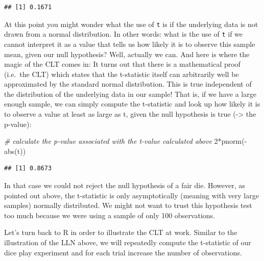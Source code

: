 \documentclass[
  12pt,
]{style/krantz}
\newenvironment{Shaded}{\begin{snugshade}}{\end{snugshade}}
\newcommand{\CommentTok}[1]{\textcolor[rgb]{0.56,0.35,0.01}{\textit{#1}}}
\newcommand{\DecValTok}[1]{\textcolor[rgb]{0.00,0.00,0.81}{#1}}
\newcommand{\FunctionTok}[1]{\textcolor[rgb]{0.00,0.00,0.00}{#1}}
\newcommand{\NormalTok}[1]{#1}
\newcommand{\SpecialCharTok}[1]{\textcolor[rgb]{0.00,0.00,0.00}{#1}}
\begin{document}
\begin{verbatim}
## [1] 0.1671
\end{verbatim}

At this point you might wonder what the use of \texttt{t} is if the underlying data is not drawn from a normal distribution. In other words: what is the use of \texttt{t} if we cannot interpret it as a value that tells us how likely it is to observe this sample mean, given our null hypothesis? Well, actually we can. And here is where the magic of the CLT comes in: It turns out that there is a mathematical proof (i.e.~the CLT) which states that the t-statistic itself can arbitrarily well be approximated by the standard normal distribution. This is true independent of the distribution of the underlying data in our sample! That is, if we have a large enough sample, we can simply compute the t-statistic and look up how likely it is to observe a value at least as large as t, given the null hypothesis is true (-\textgreater{} the p-value):

\begin{Shaded}
\begin{Highlighting}[]
\CommentTok{\# calculate the p{-}value associated with the t{-}value calculated above}
\DecValTok{2}\SpecialCharTok{*}\FunctionTok{pnorm}\NormalTok{(}\SpecialCharTok{{-}}\FunctionTok{abs}\NormalTok{(t))}
\end{Highlighting}
\end{Shaded}

\begin{verbatim}
## [1] 0.8673
\end{verbatim}

In that case we could not reject the null hypothesis of a fair die. However, as pointed out above, the t-statistic is only asymptotically (meaning with very large samples) normally distributed. We might not want to trust this hypothesis test too much because we were using a sample of only 100 observations.

Let's turn back to R in order to illustrate the CLT at work. Similar to the illustration of the LLN above, we will repeatedly compute the t-statistic of our dice play experiment and for each trial increase the number of observations.
\end{document}

